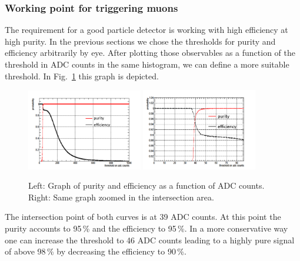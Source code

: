 		\subsubsection{Working point for triggering muons}
		\label{working_point}
			The requirement for a good particle detector is working with high efficiency at high purity.
			In the previous sections we chose the thresholds for purity and efficiency arbitrarily by eye.
			After plotting those observables as a function of the threshold in ADC counts in the same histogram, we can define a more suitable threshold.
			In Fig.\ \ref{fig:pur_eff} this graph is depicted.
			\begin{figure}[htbp]
				\centering
				\includegraphics[width=0.45\textwidth]{Figures/erdogan/pur_eff.png}
				\includegraphics[width=0.45\textwidth]{Figures/erdogan/pur_eff_zoom.png}
				\caption{Left: Graph of purity and efficiency as a function of ADC counts. Right: Same graph zoomed in the intersection area.}
				\label{fig:pur_eff}
			\end{figure}
			The intersection point of both curves is at 39 ADC counts.
			At this point the purity accounts to 95\,\% and the efficiency to 95\,\%.
			In a more conservative way one can increase the threshold to 46 ADC counts leading to a highly pure signal of above 98\,\% by decreasing the efficiency to 90\,\%.
